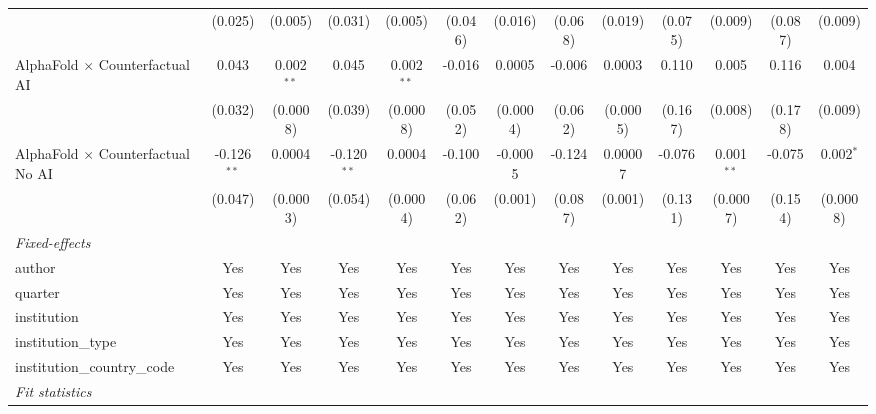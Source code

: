 \begin{tabular}{lcccccccccccc}
                                            & (0.025)       & (0.005)        & (0.031)       & (0.005)       & (0.046) & (0.016)  & (0.068) & (0.019)  & (0.075)       & (0.009)       & (0.087)      & (0.009)\\   
   AlphaFold $\times$ Counterfactual AI     & 0.043         & 0.002$^{**}$   & 0.045         & 0.002$^{**}$  & -0.016  & 0.0005   & -0.006  & 0.0003   & 0.110         & 0.005         & 0.116        & 0.004\\   
                                            & (0.032)       & (0.0008)       & (0.039)       & (0.0008)      & (0.052) & (0.0004) & (0.062) & (0.0005) & (0.167)       & (0.008)       & (0.178)      & (0.009)\\   
   AlphaFold $\times$ Counterfactual No AI  & -0.126$^{**}$ & 0.0004         & -0.120$^{**}$ & 0.0004        & -0.100  & -0.0005  & -0.124  & 0.00007  & -0.076        & 0.001$^{**}$  & -0.075       & 0.002$^{*}$\\   
                                            & (0.047)       & (0.0003)       & (0.054)       & (0.0004)      & (0.062) & (0.001)  & (0.087) & (0.001)  & (0.131)       & (0.0007)      & (0.154)      & (0.0008)\\   
   \midrule
   \emph{Fixed-effects}\\
   author                                   & Yes           & Yes            & Yes           & Yes           & Yes     & Yes      & Yes     & Yes      & Yes           & Yes           & Yes          & Yes\\  
   quarter                                  & Yes           & Yes            & Yes           & Yes           & Yes     & Yes      & Yes     & Yes      & Yes           & Yes           & Yes          & Yes\\  
   institution                              & Yes           & Yes            & Yes           & Yes           & Yes     & Yes      & Yes     & Yes      & Yes           & Yes           & Yes          & Yes\\  
   institution\_type                        & Yes           & Yes            & Yes           & Yes           & Yes     & Yes      & Yes     & Yes      & Yes           & Yes           & Yes          & Yes\\  
   institution\_country\_code               & Yes           & Yes            & Yes           & Yes           & Yes     & Yes      & Yes     & Yes      & Yes           & Yes           & Yes          & Yes\\  
   \midrule
   \emph{Fit statistics}\\

\end{tabular}
